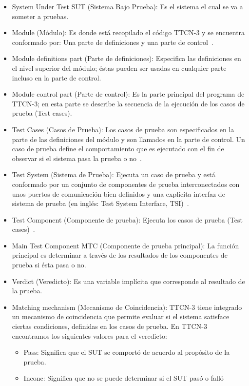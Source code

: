 \begin{itemize}
\item System Under Test SUT (Sistema Bajo Prueba): Es el sistema el cual se va 
a someter a pruebas.
\item Module (M\'odulo): Es donde est\'a recopilado el c\'odigo TTCN-3 
y se encuentra conformado por: Una parte de definiciones y una parte de 
control~\cite{Willcock2011}.
\item Module definitions part (Parte de definiciones): Especifica las 
definiciones en el nivel superior del m\'odulo; \'estas pueden ser usadas en 
cualquier parte incluso en la parte de control.
\item Module control part (Parte de control): Es la parte principal del 
programa de TTCN-3; en esta parte se describe la secuencia de la ejecuci\'on de 
los casos de prueba (Test cases).
\item Test Cases (Casos de Prueba): Los casos de prueba son especificados en 
la parte de las definiciones del m\'odulo y son llamados en la parte de control. 
Un caso de prueba define el comportamiento que es ejecutado con el fin de 
observar si el sistema pasa la prueba o no~\cite{Grabowski2003}.
\item Test System  (Sistema de Prueba): Ejecuta un caso de prueba y est\'a 
conformado por un conjunto de componentes de prueba interconectados con unos 
puertos de comunicaci\'on bien definidos y una expl\'icita interfaz de sistema 
de prueba (en ingl\'es: Test System Interface, TSI)~\cite{Grabowski2003}.
\item Test Component (Componente de prueba): Ejecuta los casos de prueba (Test 
cases)~\cite{Grabowski2003}.
\item Main Test Component MTC (Componente de prueba principal): La funci\'on 
principal es determinar a trav\'es de los resultados de los componentes de 
prueba si \'esta pasa o no.
\item Verdict (Veredicto): Es una variable impl\'icita que corresponde al 
resultado de la prueba.
\item Matching mechanism (Mecanismo de Coincidencia): TTCN-3 tiene integrado 
un mecanismo de coincidencia que permite evaluar si el sistema satisface ciertas 
condiciones, definidas en los casos de prueba. En TTCN-3 encontramos los 
siguientes valores para el veredicto:
\begin{itemize}
\item Pass: Significa que el SUT se comport\'o de acuerdo al prop\'osito de la 
prueba.
\item Inconc: Significa que no se puede determinar si el SUT pas\'o o fall\'o 

\end{itemize}
\end{itemize}
